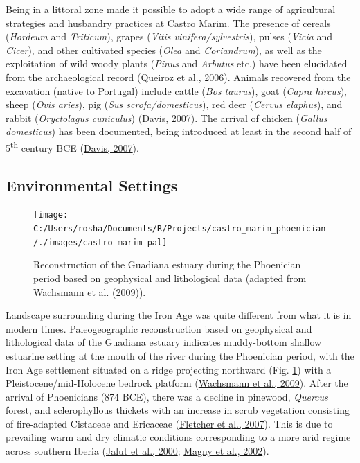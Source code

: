 \documentclass[3p]{elsarticle} %
\begin{document}
Being in a littoral zone made it possible to adopt a wide range of agricultural strategies and husbandry practices at Castro Marim. The presence of cereals (\emph{Hordeum} and \emph{Triticum}), grapes (\emph{Vitis vinifera/sylvestris}), pulses (\emph{Vicia} and \emph{Cicer}), and other cultivated species (\emph{Olea} and \emph{Coriandrum}), as well as the exploitation of wild woody plants (\emph{Pinus} and \emph{Arbutus} etc.) have been elucidated from the archaeological record (\protect\hyperlink{ref-queiroz_etal06}{Queiroz et al., 2006}). Animals recovered from the excavation (native to Portugal) include cattle (\emph{Bos taurus}), goat (\emph{Capra hircus}), sheep (\emph{Ovis aries}), pig (\emph{Sus scrofa/domesticus}), red deer (\emph{Cervus elaphus}), and rabbit (\emph{Oryctolagus cuniculus}) (\protect\hyperlink{ref-davis07}{Davis, 2007}). The arrival of chicken (\emph{Gallus domesticus}) has been documented, being introduced at least in the second half of 5\textsuperscript{th} century BCE (\protect\hyperlink{ref-davis07}{Davis, 2007}).

\hypertarget{environmental-settings}{%
\subsection{Environmental Settings}\label{environmental-settings}}



\begin{figure}

{\centering \texttt{[image: C:/Users/rosha/Documents/R/Projects/castro\_marim\_phoenician/./images/castro\_marim\_pal]} 

}

\caption{Reconstruction of the Guadiana estuary during the Phoenician period based on geophysical and lithological data (adapted from Wachsmann et al. (\protect\hyperlink{ref-wachsmann_etal09}{2009})).}\label{fig:castro-marim-pal}
\end{figure}

Landscape surrounding during the Iron Age was quite different from what it is in modern times. Paleogeographic reconstruction based on geophysical and lithological data of the Guadiana estuary indicates muddy-bottom shallow estuarine setting at the mouth of the river during the Phoenician period, with the Iron Age settlement situated on a ridge projecting northward (Fig. \ref{fig:castro-marim-pal}) with a Pleistocene/mid-Holocene bedrock platform (\protect\hyperlink{ref-wachsmann_etal09}{Wachsmann et al., 2009}). After the arrival of Phoenicians (874 BCE), there was a decline in pinewood, \emph{Quercus} forest, and sclerophyllous thickets with an increase in scrub vegetation consisting of fire-adapted Cistaceae and Ericaceae (\protect\hyperlink{ref-fletcher_etal07}{Fletcher et al., 2007}). This is due to prevailing warm and dry climatic conditions corresponding to a more arid regime across southern Iberia (\protect\hyperlink{ref-jalut_etal00}{Jalut et al., 2000}; \protect\hyperlink{ref-magny_etal02}{Magny et al., 2002}).
\end{document}
